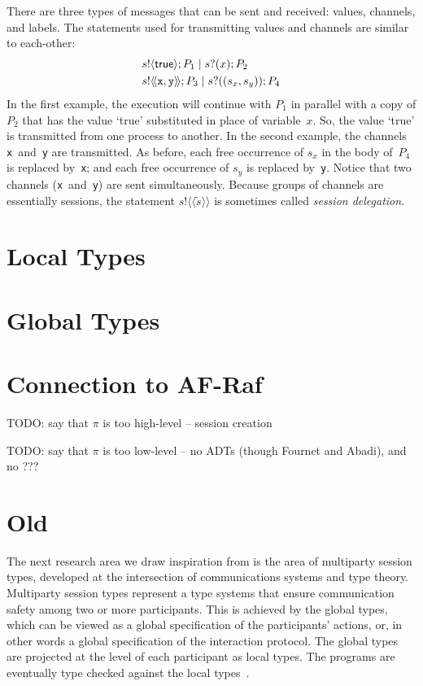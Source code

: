\documentclass[a4paper,12pt,oneside,fleqn]{book} %
\newcommand*\llangle{\mathopen{\langle\!\langle}}
\newcommand*\rrangle{\mathclose{\rangle\!\rangle}}
\begin{document}
There are three types of messages that can be sent and received:
  values, channels, and labels.
The statements used for transmitting values and channels
  are similar to each-other:
\begin{align}
  &s! \langle {\sf true} \rangle; P_1 \mid s? (x); P_2
\\
  &s! \llangle {\tt x},{\tt y} \rrangle; P_3 \mid s? ((s_x,s_y)); P_4
\end{align}
In the first example,
  the execution will continue with $P_1$ in parallel
    with a copy of $P_2$ that has the value `true' substituted
    in place of variable~$x$.
So, the value `true' is transmitted from one process to another.
In the second example,
  the channels {\tt x}~and~{\tt y} are transmitted.
As before,
  each free occurrence of $s_x$ in the body of~$P_4$ is replaced by~{\tt x};
  and each free occurrence of $s_y$ is replaced by~{\tt y}.
Notice that two channels ({\tt x}~and~{\tt y}) are sent simultaneously.
Because groups of channels are essentially sessions,
  the statement $s!\llangle\tilde{s}\rrangle$ is sometimes
    called \emph{session delegation}.


\section{Local Types}
\label{sec:mast-local}

\section{Global Types}
\label{sec:mast-global}

\section{Connection to AF-Raf}
\label{sec:mast-vs-afraf}

TODO: say that $\pi$ is too high-level -- session creation

TODO: say that $\pi$ is too low-level
  -- no ADTs (though Fournet and Abadi), and no ???

\section{Old}



The next research area we draw inspiration from is the area of multiparty
session types, developed at the intersection of communications systems and
type theory. Multiparty session types represent a type systems that ensure
communication safety among two or more participants. This is achieved by
the global types, which can be viewed as a global specification of the
participants' actions, or, in other words a global specification of the
interaction protocol. The global types are projected at the level of each
participant as local types. The programs are eventually type checked
against the local types~\cite{DBLP:journals/jacm/HondaYC16}.
\end{document}
